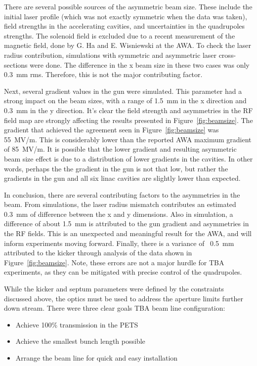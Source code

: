 There are several possible sources of the asymmetric beam size. 
These include the initial laser profile (which was not exactly symmetric
when the data was taken), field strengths in the accelerating cavities, 
and uncertainties in the quadrupoles strengths.
The solenoid field is excluded due to a recent measurement of the magnetic field, 
done by G. Ha and E. Wisniewski at the AWA. 
To check the laser radius contribution, simulations with symmetric and asymmetric laser cross-sections were done.
The difference in the x beam size in these two cases was only \SI{0.3}{mm} rms. 
Therefore, this is not the major contributing factor.

Next, several gradient values in the gun were simulated. 
This parameter had a strong impact on the beam sizes, with a range of \SI{1.5}{mm} 
in the x direction and \SI{0.3}{mm} in the y direction.
It's clear the field strength and asymmetries in the RF field map 
are strongly affecting the results presented in Figure~\ref{fig:beamsize}.
The gradient that achieved the agreement seen in Figure~\ref{fig:beamsize} was \SI{55}{MV/m}.
This is considerably lower than the reported AWA maximum gradient of \SI{85}{MV/m}.
It is possible that the lower gradient and resulting asymmetric beam size effect is 
due to a distribution of lower gradients in the cavities. 
In other words, perhaps the the gradient in the gun is not that low, but rather
the gradients in the gun and all six linac cavities are slightly lower than expected.

In conclusion, there are several contributing factors to the asymmetries in the beam.
From simulations, the laser radius mismatch contributes an estimated \SI{0.3}{mm} of difference 
between the x and y dimensions. Also in simulation, a difference of about \SI{1.5}{mm} 
is attributed to the gun gradient and asymmetries in the RF fields. 
This is an unexpected and meaningful result for the AWA, and will inform experiments moving forward.
Finally, there is a variance of ~\SI{0.5}{mm} attributed to the kicker through analysis of the 
data shown in Figure~\ref{fig:beamsize}.
Note, these errors are not a major hurdle for TBA experiments, as they can
be mitigated with precise control of the quadrupoles.



While the kicker and septum parameters were defined by the constraints discussed above, 
the optics must be used to address the aperture limits further down stream.
There were three clear goals TBA beam line configuration: 
\begin{itemize}
	\item Achieve 100\% transmission in the PETS
	\item Achieve the smallest bunch length possible
	\item Arrange the beam line for quick and easy installation
\end{itemize}

